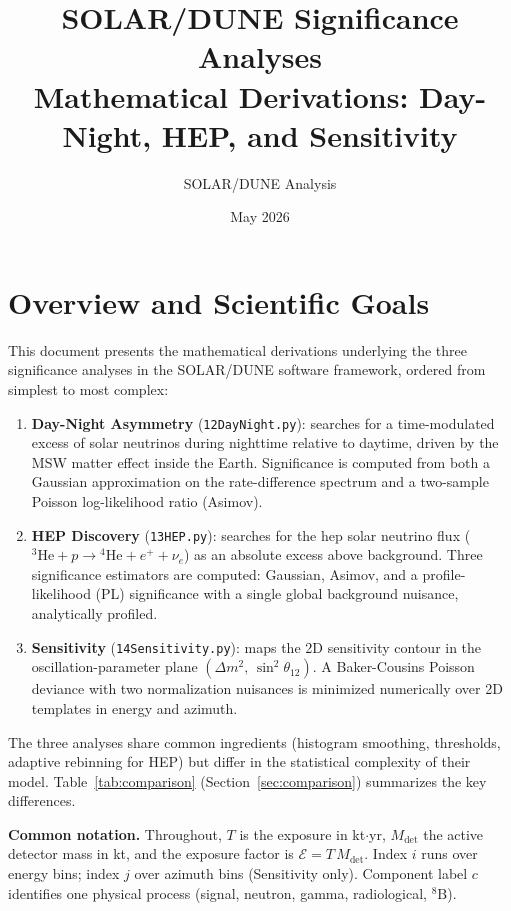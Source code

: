 \documentclass[12pt,a4paper]{article}
\title{%
  SOLAR/DUNE Significance Analyses\\
  \large Mathematical Derivations: Day-Night, HEP, and Sensitivity%
}
\author{SOLAR/DUNE Analysis}
\date{May 2026}
\newcommand{\Ecal}{\mathcal{E}}          %
\newcommand{\Mdet}{M_{\mathrm{det}}}     %
\begin{document}
\maketitle
\tableofcontents
\newpage

\section{Overview and Scientific Goals}
\label{sec:overview}

This document presents the mathematical derivations underlying the three
significance analyses in the SOLAR/DUNE software framework,
ordered from simplest to most complex:

\begin{enumerate}[leftmargin=*]
  \item \textbf{Day-Night Asymmetry} (\texttt{12DayNight.py}):
    searches for a time-modulated excess of solar neutrinos during nighttime
    relative to daytime, driven by the MSW matter effect inside the Earth.
    Significance is computed from both a Gaussian approximation on the
    rate-difference spectrum and a two-sample Poisson log-likelihood ratio
    (Asimov).

  \item \textbf{HEP Discovery} (\texttt{13HEP.py}):
    searches for the hep solar neutrino flux ($^3\mathrm{He}+p \to
    {}^4\mathrm{He}+e^++\nu_e$) as an absolute excess above background.
    Three significance estimators are computed: Gaussian, Asimov, and a
    profile-likelihood (PL) significance with a single global background
    nuisance, analytically profiled.

  \item \textbf{Sensitivity} (\texttt{14Sensitivity.py}):
    maps the 2D sensitivity contour in the oscillation-parameter plane
    $(\Delta m^2,\,\sin^2\theta_{12})$.
    A Baker-Cousins Poisson deviance with two normalization nuisances
    is minimized numerically over 2D templates in energy and azimuth.
\end{enumerate}

The three analyses share common ingredients (histogram smoothing, thresholds,
adaptive rebinning for HEP) but differ in the statistical complexity of their
model.  Table~\ref{tab:comparison} (Section~\ref{sec:comparison}) summarizes
the key differences.

\medskip
\noindent\textbf{Common notation.}
Throughout, $T$ is the exposure in kt$\cdot$yr,
$\Mdet$ the active detector mass in kt,
and the exposure factor is $\Ecal = T\,\Mdet$.
Index $i$ runs over energy bins; index $j$ over azimuth bins (Sensitivity
only).  Component label $c$ identifies one physical process (signal,
neutron, gamma, radiological, ${}^8\mathrm{B}$).
\end{document}

